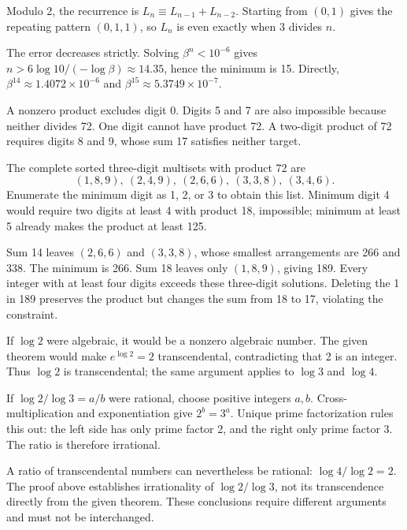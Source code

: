Modulo 2, the recurrence is $L_n\equiv L_{n-1}+L_{n-2}$. Starting from $(0,1)$ gives the repeating pattern $(0,1,1)$, so $L_n$ is even exactly when $3$ divides $n$.

The error decreases strictly. Solving $\beta^n<10^{-6}$ gives $n>6\log10/(-\log\beta)\approx14.35$, hence the minimum is 15. Directly, $\beta^{14}\approx1.4072\times10^{-6}$ and $\beta^{15}\approx5.3749\times10^{-7}$.

A nonzero product excludes digit 0. Digits 5 and 7 are also impossible because neither divides 72. One digit cannot have product 72. A two-digit product of 72 requires digits 8 and 9, whose sum 17 satisfies neither target.

The complete sorted three-digit multisets with product 72 are
\[
(1,8,9),\ (2,4,9),\ (2,6,6),\ (3,3,8),\ (3,4,6).
\]
Enumerate the minimum digit as 1, 2, or 3 to obtain this list. Minimum digit 4 would require two digits at least 4 with product 18, impossible; minimum at least 5 already makes the product at least 125.

Sum 14 leaves $(2,6,6)$ and $(3,3,8)$, whose smallest arrangements are 266 and 338. The minimum is 266. Sum 18 leaves only $(1,8,9)$, giving 189. Every integer with at least four digits exceeds these three-digit solutions. Deleting the 1 in 189 preserves the product but changes the sum from 18 to 17, violating the constraint.

If $\log2$ were algebraic, it would be a nonzero algebraic number. The given theorem would make $e^{\log2}=2$ transcendental, contradicting that 2 is an integer. Thus $\log2$ is transcendental; the same argument applies to $\log3$ and $\log4$.

If $\log2/\log3=a/b$ were rational, choose positive integers $a,b$. Cross-multiplication and exponentiation give $2^b=3^a$. Unique prime factorization rules this out: the left side has only prime factor 2, and the right only prime factor 3. The ratio is therefore irrational.

A ratio of transcendental numbers can nevertheless be rational: $\log4/\log2=2$. The proof above establishes irrationality of $\log2/\log3$, not its transcendence directly from the given theorem. These conclusions require different arguments and must not be interchanged.
